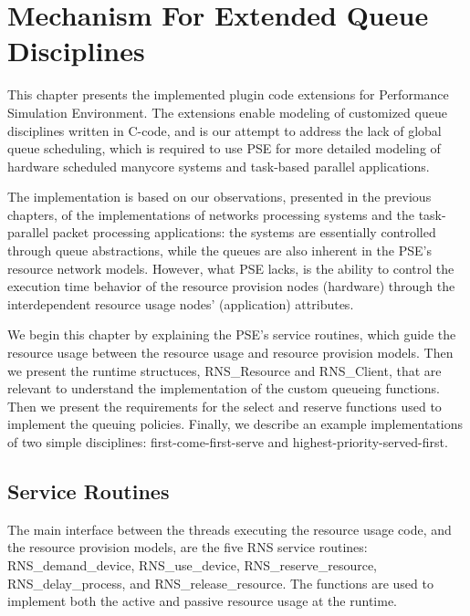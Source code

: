 \chapter{Mechanism For Extended Queue Disciplines}
\label{chapter:mechanism-for-extended-queue-disciplines}

This chapter presents the implemented plugin code extensions for Performance Simulation Environment. The extensions enable modeling of customized queue disciplines written in C-code, and is our attempt to address the lack of global queue scheduling, which is required to use PSE for more detailed modeling of hardware scheduled manycore systems and task-based parallel applications.

The implementation is based on our observations, presented in the previous chapters, of the implementations of networks processing systems and the task-parallel packet processing applications: the systems are essentially controlled through queue abstractions, while the queues are also inherent in the PSE's resource network models. However, what PSE lacks, is the ability to control the execution time behavior of the resource provision nodes (hardware) through the interdependent resource usage nodes' (application) attributes.

We begin this chapter by explaining the PSE's service routines, which guide the resource usage between the resource usage and resource provision models. Then we present the runtime structuces, RNS\_Resource and RNS\_Client, that are relevant to understand the implementation of the custom queueing functions. Then we present the requirements for the select and reserve functions used to implement the queuing policies. Finally, we describe an example implementations of two simple disciplines: first-come-first-serve and highest-priority-served-first.

\section{Service Routines}
The main interface between the threads executing the resource usage code, and the resource provision models, are the five RNS service routines: RNS\_demand\_device, RNS\_use\_device, RNS\_reserve\_resource, RNS\_delay\_process, and RNS\_release\_resource. The functions are used to implement both the active and passive resource usage at the runtime.



